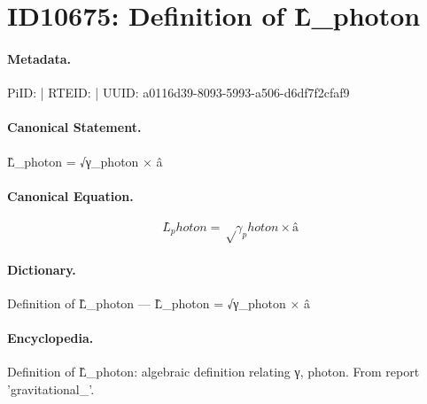 \section*{ID10675: Definition of L̂\_photon}
\paragraph{Metadata.}
PiID:  | RTEID:  | UUID: a0116d39-8093-5993-a506-d6df7f2cfaf9

\paragraph{Canonical Statement.}
L̂\_photon = √γ\_photon × â

\paragraph{Canonical Equation.}
\[
L̂_photon = √γ_photon × â
\]

\paragraph{Dictionary.}
Definition of L̂\_photon — L̂\_photon = √γ\_photon × â

\paragraph{Encyclopedia.}
Definition of L̂\_photon: algebraic definition relating γ, photon. From report 'gravitational\_'.
